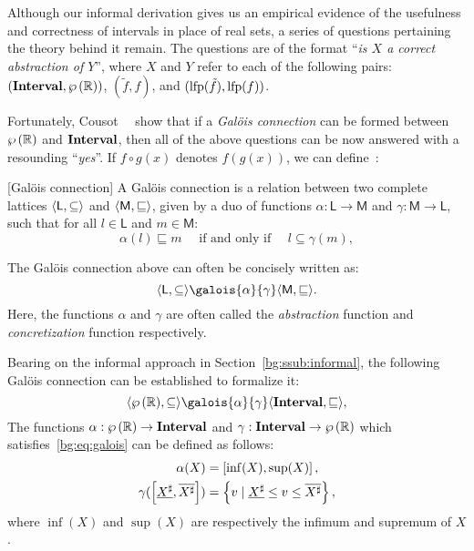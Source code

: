 Although our informal derivation gives us an empirical evidence of the
usefulness and correctness of intervals in place of real sets, a series of
questions pertaining the theory behind it remain.  The questions are of the
format ``\emph{is $X$ a correct abstraction of $Y$}'', where $X$ and $Y$
refer to each of the following pairs: $(\mathbf{Interval}, \wp\left({\mathbb{R}}\right))$,
$(\tilde{f}, f)$, and $(\operatorname{\mathrm{lfp}} (\tilde{f}), \operatorname{\mathrm{lfp}} (f))$.

Fortunately, Cousot~\etal~\cite{cousot77} show that if a \emph{Gal\"ois
connection} can be formed between $\wp\left({\mathbb{R}}\right)$ and $\mathbf{Interval}$,
then all of the above questions can be now answered with a resounding
``\emph{yes}''.  If $f \circ g (x)$ denotes $f(g(x))$, we can
define~\cite{nielson99}:
\begin{definition}
    \textup{[Gal\"ois connection]}
    A Gal\"ois connection is a relation between two complete lattices
    $\langle{\mathsf{L}}, {\subseteq}\rangle$ and $\langle{\mathsf{M}}, {\sqsubseteq}\rangle$,
    given by a duo of functions $\alpha: \mathsf{L} \to \mathsf{M}$ and
    $\gamma: \mathsf{M} \to \mathsf{L}$, such that for all $l \in \mathsf{L}$
    and $m \in \mathsf{M}$:
    \begin{equation}
        \alpha (l) \sqsubseteq m
        \quad
        \text{~if and only if~}
        \quad
        l \subseteq \gamma (m),
        \label{bg:eq:galois}
    \end{equation}
\end{definition}\vspace{-16.5pt}
The Gal\"ois connection above can often be concisely written as:
\begin{equation}
    \lattice{\mathsf{L}}{\subseteq}
        \galois{\alpha}{\gamma}
    \lattice{\mathsf{M}}{\sqsubseteq}.
\end{equation}
Here, the functions $\alpha$ and $\gamma$ are often called the
\emph{abstraction} function and \emph{concretization} function respectively.

Bearing on the informal approach in Section~\ref{bg:ssub:informal}, the
following Gal\"ois connection can be established to formalize it:
\begin{equation}
    \lattice{\powersetof\realset}{\subseteq}
    \galois{\alpha}{\gamma}
    \lattice{\intervalset}{\sqsubseteq},
\end{equation}
The functions $\alpha: \wp\left({\mathbb{R}}\right) \to \mathbf{Interval}$ and $\gamma:
\mathbf{Interval} \to \wp\left({\mathbb{R}}\right)$ which satisfies~\eqref{bg:eq:galois} can
be defined as follows:
\begin{equation}
    \begin{aligned}
        \alpha(X) &= \left[{\inf(X)}, {\sup(X)}\right], \\
        \gamma(\left[{\underline{X^\sharp}}, {\overline{X^\sharp}}\right])
            &= \left\{
                v \mid \underline{X^\sharp} \leq v \leq \overline{X^\sharp}
            \right\},
    \end{aligned}
\end{equation}
where $\inf(X)$ and $\sup(X)$ are respectively the infimum and supremum of $X$.

